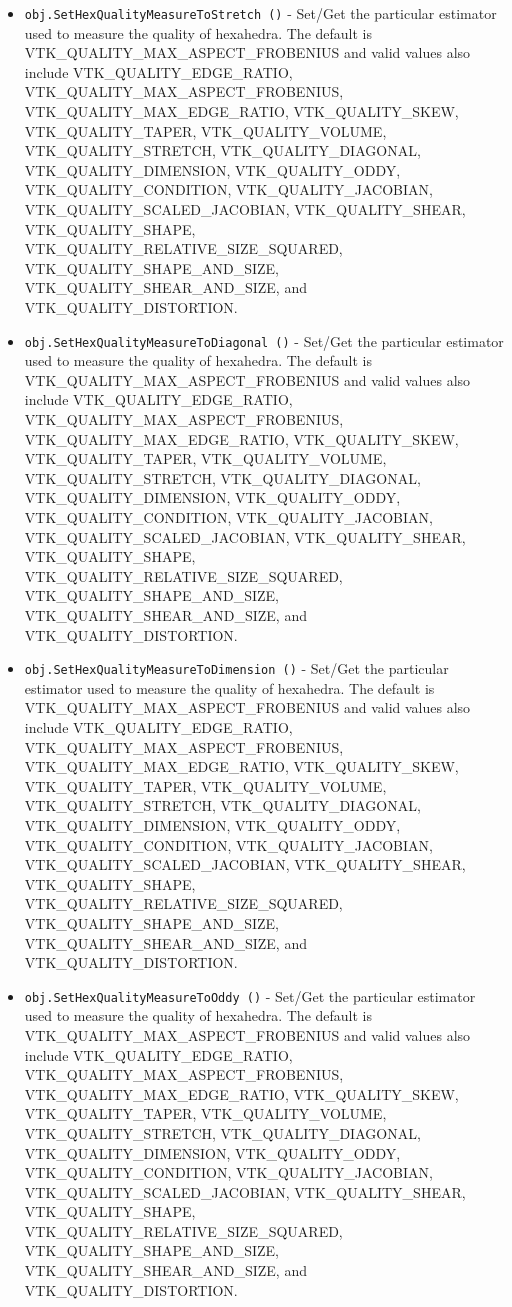 \begin{itemize}
\item  \verb|obj.SetHexQualityMeasureToStretch ()| -  Set/Get the particular estimator used to measure the quality of hexahedra.
 The default is VTK\_QUALITY\_MAX\_ASPECT\_FROBENIUS and valid values also include
 VTK\_QUALITY\_EDGE\_RATIO, VTK\_QUALITY\_MAX\_ASPECT\_FROBENIUS, 
 VTK\_QUALITY\_MAX\_EDGE\_RATIO, VTK\_QUALITY\_SKEW, VTK\_QUALITY\_TAPER, VTK\_QUALITY\_VOLUME,
 VTK\_QUALITY\_STRETCH, VTK\_QUALITY\_DIAGONAL, VTK\_QUALITY\_DIMENSION,
 VTK\_QUALITY\_ODDY, VTK\_QUALITY\_CONDITION, VTK\_QUALITY\_JACOBIAN,
 VTK\_QUALITY\_SCALED\_JACOBIAN, VTK\_QUALITY\_SHEAR, VTK\_QUALITY\_SHAPE,
 VTK\_QUALITY\_RELATIVE\_SIZE\_SQUARED, VTK\_QUALITY\_SHAPE\_AND\_SIZE,
 VTK\_QUALITY\_SHEAR\_AND\_SIZE, and VTK\_QUALITY\_DISTORTION.

\item  \verb|obj.SetHexQualityMeasureToDiagonal ()| -  Set/Get the particular estimator used to measure the quality of hexahedra.
 The default is VTK\_QUALITY\_MAX\_ASPECT\_FROBENIUS and valid values also include
 VTK\_QUALITY\_EDGE\_RATIO, VTK\_QUALITY\_MAX\_ASPECT\_FROBENIUS, 
 VTK\_QUALITY\_MAX\_EDGE\_RATIO, VTK\_QUALITY\_SKEW, VTK\_QUALITY\_TAPER, VTK\_QUALITY\_VOLUME,
 VTK\_QUALITY\_STRETCH, VTK\_QUALITY\_DIAGONAL, VTK\_QUALITY\_DIMENSION,
 VTK\_QUALITY\_ODDY, VTK\_QUALITY\_CONDITION, VTK\_QUALITY\_JACOBIAN,
 VTK\_QUALITY\_SCALED\_JACOBIAN, VTK\_QUALITY\_SHEAR, VTK\_QUALITY\_SHAPE,
 VTK\_QUALITY\_RELATIVE\_SIZE\_SQUARED, VTK\_QUALITY\_SHAPE\_AND\_SIZE,
 VTK\_QUALITY\_SHEAR\_AND\_SIZE, and VTK\_QUALITY\_DISTORTION.

\item  \verb|obj.SetHexQualityMeasureToDimension ()| -  Set/Get the particular estimator used to measure the quality of hexahedra.
 The default is VTK\_QUALITY\_MAX\_ASPECT\_FROBENIUS and valid values also include
 VTK\_QUALITY\_EDGE\_RATIO, VTK\_QUALITY\_MAX\_ASPECT\_FROBENIUS, 
 VTK\_QUALITY\_MAX\_EDGE\_RATIO, VTK\_QUALITY\_SKEW, VTK\_QUALITY\_TAPER, VTK\_QUALITY\_VOLUME,
 VTK\_QUALITY\_STRETCH, VTK\_QUALITY\_DIAGONAL, VTK\_QUALITY\_DIMENSION,
 VTK\_QUALITY\_ODDY, VTK\_QUALITY\_CONDITION, VTK\_QUALITY\_JACOBIAN,
 VTK\_QUALITY\_SCALED\_JACOBIAN, VTK\_QUALITY\_SHEAR, VTK\_QUALITY\_SHAPE,
 VTK\_QUALITY\_RELATIVE\_SIZE\_SQUARED, VTK\_QUALITY\_SHAPE\_AND\_SIZE,
 VTK\_QUALITY\_SHEAR\_AND\_SIZE, and VTK\_QUALITY\_DISTORTION.

\item  \verb|obj.SetHexQualityMeasureToOddy ()| -  Set/Get the particular estimator used to measure the quality of hexahedra.
 The default is VTK\_QUALITY\_MAX\_ASPECT\_FROBENIUS and valid values also include
 VTK\_QUALITY\_EDGE\_RATIO, VTK\_QUALITY\_MAX\_ASPECT\_FROBENIUS, 
 VTK\_QUALITY\_MAX\_EDGE\_RATIO, VTK\_QUALITY\_SKEW, VTK\_QUALITY\_TAPER, VTK\_QUALITY\_VOLUME,
 VTK\_QUALITY\_STRETCH, VTK\_QUALITY\_DIAGONAL, VTK\_QUALITY\_DIMENSION,
 VTK\_QUALITY\_ODDY, VTK\_QUALITY\_CONDITION, VTK\_QUALITY\_JACOBIAN,
 VTK\_QUALITY\_SCALED\_JACOBIAN, VTK\_QUALITY\_SHEAR, VTK\_QUALITY\_SHAPE,
 VTK\_QUALITY\_RELATIVE\_SIZE\_SQUARED, VTK\_QUALITY\_SHAPE\_AND\_SIZE,
 VTK\_QUALITY\_SHEAR\_AND\_SIZE, and VTK\_QUALITY\_DISTORTION.


\end{itemize}
